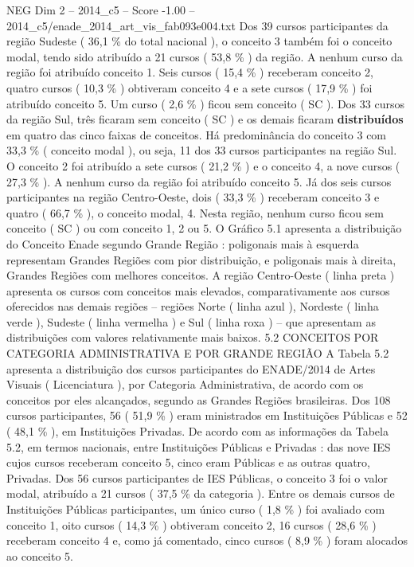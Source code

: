 \begin{textsample}{NEG Dim 2 – 2014\_c5 – Score -1.00 – 2014\_c5/enade\_2014\_art\_vis\_fab093e004.txt}
Dos 39 cursos participantes da região Sudeste ( 36,1 \% do total nacional ), o conceito 3 também foi o conceito modal, tendo sido atribuído a 21 cursos ( 53,8 \% ) da região.
A nenhum curso da região foi atribuído conceito 1.
Seis cursos ( 15,4 \% ) receberam conceito 2, quatro cursos ( 10,3 \% ) obtiveram conceito 4 e a sete cursos ( 17,9 \% ) foi atribuído conceito 5.
Um curso ( 2,6 \% ) ficou sem conceito ( SC ).
Dos 33 cursos da região Sul, três ficaram sem conceito ( SC ) e os demais ficaram \textbf{distribuídos} em quatro das cinco faixas de conceitos.
Há predominância do conceito 3 com 33,3 \% ( conceito modal ), ou seja, 11 dos 33 cursos participantes na região Sul.
O conceito 2 foi atribuído a sete cursos ( 21,2 \% ) e o conceito 4, a nove cursos ( 27,3 \% ).
A nenhum curso da região foi atribuído conceito 5.
Já dos seis cursos participantes na região Centro-Oeste, dois ( 33,3 \% ) receberam conceito 3 e quatro ( 66,7 \% ), o conceito modal, 4.
Nesta região, nenhum curso ficou sem conceito ( SC ) ou com conceito 1, 2 ou 5.
O Gráfico 5.1 apresenta a distribuição do Conceito Enade segundo Grande Região : poligonais mais à esquerda representam Grandes Regiões com pior distribuição, e poligonais mais à direita, Grandes Regiões com melhores conceitos.
A região Centro-Oeste ( linha preta ) apresenta os cursos com conceitos mais elevados, comparativamente aos cursos oferecidos nas demais regiões – regiões Norte ( linha azul ), Nordeste ( linha verde ), Sudeste ( linha vermelha ) e Sul ( linha roxa ) – que apresentam as distribuições com valores relativamente mais baixos. 5.2 CONCEITOS POR CATEGORIA ADMINISTRATIVA E POR GRANDE REGIÃO A Tabela 5.2 apresenta a distribuição dos cursos participantes do ENADE/2014 de Artes Visuais ( Licenciatura ), por Categoria Administrativa, de acordo com os conceitos por eles alcançados, segundo as Grandes Regiões brasileiras.
Dos 108 cursos participantes, 56 ( 51,9 \% ) eram ministrados em Instituições Públicas e 52 ( 48,1 \% ), em Instituições Privadas.
De acordo com as informações da Tabela 5.2, em termos nacionais, entre Instituições Públicas e Privadas : das nove IES cujos cursos receberam conceito 5, cinco eram Públicas e as outras quatro, Privadas.
Dos 56 cursos participantes de IES Públicas, o conceito 3 foi o valor modal, atribuído a 21 cursos ( 37,5 \% da categoria ).
Entre os demais cursos de Instituições Públicas participantes, um único curso ( 1,8 \% ) foi avaliado com conceito 1, oito cursos ( 14,3 \% ) obtiveram conceito 2, 16 cursos ( 28,6 \% ) receberam conceito 4 e, como já comentado, cinco cursos ( 8,9 \% ) foram alocados ao conceito 5.

\end{textsample}
